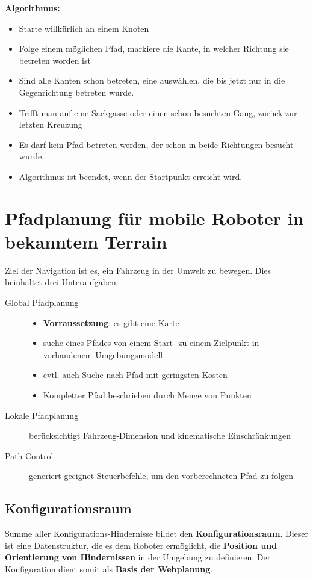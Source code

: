 \textbf{Algorithmus:}
\begin{itemize}
	\item Starte willkürlich an einem Knoten
	\item Folge einem möglichen Pfad, markiere die Kante, in welcher Richtung
		sie betreten worden ist
	\item Sind alle Kanten schon betreten, eine auswählen, die bis jetzt nur in
		die Gegenrichtung betreten wurde.
	\item Trifft man auf eine Sackgasse oder einen schon besuchten Gang, zurück
		zur letzten Kreuzung
	\item Es darf kein Pfad betreten werden, der schon in beide Richtungen
		besucht wurde.
	\item Algorithmus ist beendet, wenn der Startpunkt erreicht wird.
\end{itemize}

\section{Pfadplanung für mobile Roboter in bekanntem Terrain}
Ziel der Navigation ist es, ein Fahrzeug in der Umwelt zu bewegen.
Dies beinhaltet drei Unteraufgaben:
\begin{description}
	\item[Global Pfadplanung]
	\begin{itemize}
		\item \textbf{Vorraussetzung}: es gibt eine Karte
		\item suche eines Pfades von einem Start- zu einem Zielpunkt in vorhandenem Umgebungsmodell
		\item evtl. auch Suche nach Pfad mit geringsten Kosten
		\item Kompletter Pfad beschrieben durch Menge von Punkten
	\end{itemize}
	\item[Lokale Pfadplanung] berücksichtigt Fahrzeug-Dimension und kinematische
		Einschränkungen
	\item[Path Control] generiert geeignet Steuerbefehle, um den vorberechneten
		Pfad zu folgen
\end{description}

\subsection{Konfigurationsraum}
Summe aller Konfigurations-Hindernisse bildet den \textbf{Konfigurationsraum}.
Dieser ist eine Datenstruktur, die es dem Roboter ermöglicht, die \textbf{
Position und Orientierung von Hindernissen} in der Umgebung zu definieren. Der
Konfiguration dient somit als \textbf{Basis der Webplanung}.

